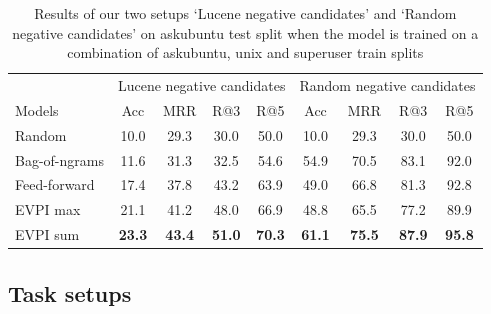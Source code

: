 \documentclass[11pt]{report}
\begin{document}


\begin{table}[t]
\small
\centering
\begin{tabular}{l|cccc|cccc}
\toprule
 & \multicolumn{4}{c|}{Lucene negative candidates} & \multicolumn{4}{c}{Random negative candidates} \\
Models & Acc & MRR & R@3 & R@5 & Acc & MRR & R@3 & R@5\\
\midrule
Random  & 10.0 & 29.3 & 30.0 & 50.0 &10.0 & 29.3 & 30.0 & 50.0 \\
Bag-of-ngrams & 11.6 & 31.3 & 32.5 & 54.6 & 54.9 & 70.5 & 83.1 & 92.0 \\
Feed-forward & 17.4 & 37.8 & 43.2 & 63.9 &  49.0 & 66.8 & 81.3 & 92.8 \\
EVPI max  & 21.1 & 41.2 & 48.0 & 66.9  & 48.8 & 65.5 & 77.2 & 89.9 \\
EVPI sum & \bf 23.3 & \bf 43.4 & \bf 51.0 & \bf 70.3 & \bf 61.1 & \bf 75.5 & \bf 87.9  & \bf 95.8  \\
\bottomrule
\end{tabular}
\label{results_topN}
\caption{Results of our two setups `Lucene negative candidates' and `Random negative candidates' on askubuntu test split when the model is trained on a combination of askubuntu, unix and superuser train splits}
\end{table}


\subsection{Task setups}\label{task_setup}
\end{document}
